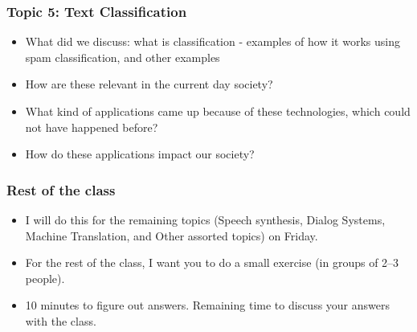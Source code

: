 \documentclass{beamer}
\begin{document}
\begin{frame}
\frametitle{Topic 5: Text Classification}
\begin{itemize}
\item What did we discuss: what is classification - examples of how it works using spam classification, and other examples
\item How are these relevant in the current day society?
\item What kind of applications came up because of these technologies, which could not have happened before?
\item How do these applications impact our society? 
\end{itemize}
\end{frame}

\begin{frame}
\frametitle{Rest of the class}
\begin{itemize}
\item I will do this for the remaining topics (Speech synthesis, Dialog Systems, Machine Translation, and Other assorted topics) on Friday.
\item For the rest of the class, I want you to do a small exercise (in groups of 2--3 people). 
\item 10 minutes to figure out answers. Remaining time to discuss your answers with the class. 
\end{itemize}
\end{frame}
\end{document}
